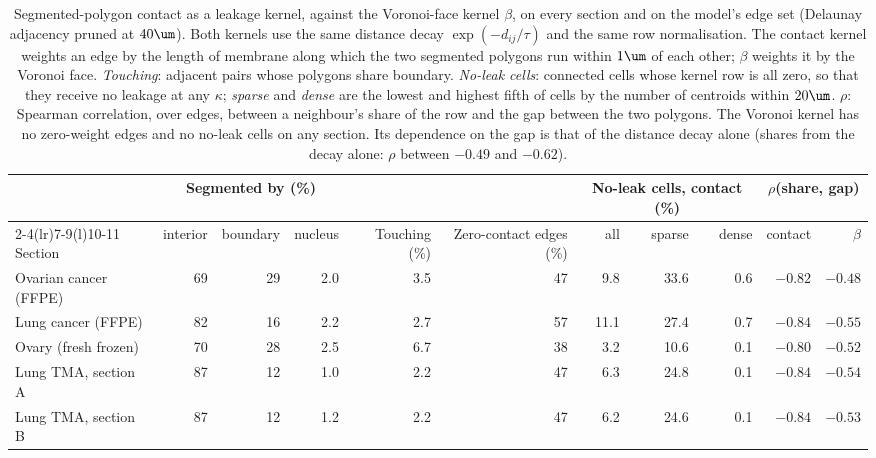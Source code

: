 
\begin{table}[t]
\centering
\caption{Segmented-polygon contact as a leakage kernel, against the Voronoi-face kernel $\beta$, on every section and on the model's edge set (Delaunay adjacency pruned at $40\um$). Both kernels use the same distance decay $\exp(-d_{ij}/\tau)$ and the same row normalisation. The contact kernel weights an edge by the length of membrane along which the two segmented polygons run within $1\um$ of each other; $\beta$ weights it by the Voronoi face. \emph{Touching}: adjacent pairs whose polygons share boundary. \emph{No-leak cells}: connected cells whose kernel row is all zero, so that they receive no leakage at any $\kappa$; \emph{sparse} and \emph{dense} are the lowest and highest fifth of cells by the number of centroids within $20\um$. $\rho$: Spearman correlation, over edges, between a neighbour's share of the row and the gap between the two polygons. The Voronoi kernel has no zero-weight edges and no no-leak cells on any section. Its dependence on the gap is that of the distance decay alone (shares from the decay alone: $\rho$ between $-0.49$ and $-0.62$).}
\label{tab:contact}
\small
\begin{tabular}{@{}lrrrrrrrrrr@{}}
\toprule
& \multicolumn{3}{c}{Segmented by (\%)} & & & \multicolumn{3}{c}{No-leak cells, contact (\%)} & \multicolumn{2}{c}{$\rho$(share, gap)} \\
\cmidrule(lr){2-4}\cmidrule(lr){7-9}\cmidrule(l){10-11}
Section & interior & boundary & nucleus & Touching (\%) & Zero-contact edges (\%) & all & sparse & dense & contact & $\beta$ \\
\midrule
Ovarian cancer (FFPE) & 69 & 29 & 2.0 & 3.5 & 47 & 9.8 & 33.6 & 0.6 & $-0.82$ & $-0.48$ \\
Lung cancer (FFPE) & 82 & 16 & 2.2 & 2.7 & 57 & 11.1 & 27.4 & 0.7 & $-0.84$ & $-0.55$ \\
Ovary (fresh frozen) & 70 & 28 & 2.5 & 6.7 & 38 & 3.2 & 10.6 & 0.1 & $-0.80$ & $-0.52$ \\
Lung TMA, section A & 87 & 12 & 1.0 & 2.2 & 47 & 6.3 & 24.8 & 0.1 & $-0.84$ & $-0.54$ \\
Lung TMA, section B & 87 & 12 & 1.2 & 2.2 & 47 & 6.2 & 24.6 & 0.1 & $-0.84$ & $-0.53$ \\
\bottomrule
\end{tabular}
\end{table}
